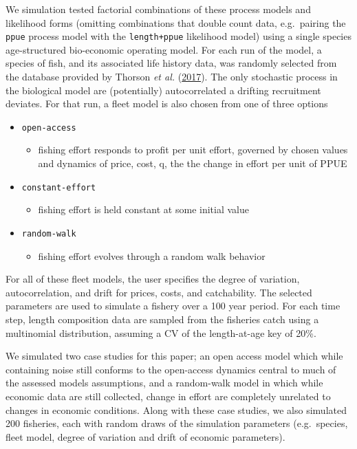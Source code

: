 \documentclass[twoside,12pt,final]{ucthesis-CA2012}
\providecommand{\tightlist}{%
  \setlength{\itemsep}{0pt}\setlength{\parskip}{0pt}}
\begin{document}
\begin{ucmainmatter}
We simulation tested factorial combinations of these process models and
likelihood forms (omitting combinations that double count data,
e.g.~pairing the \texttt{ppue} process model with the
\texttt{length+ppue} likelihood model) using a single species
age-structured bio-economic operating model. For each run of the model,
a species of fish, and its associated life history data, was randomly
selected from the database provided by Thorson \emph{et al.}
(\protect\hyperlink{ref-Thorson2017d}{2017}). The only stochastic
process in the biological model are (potentially) autocorrelated a
drifting recruitment deviates. For that run, a fleet model is also
chosen from one of three options
\begin{itemize}
\tightlist
\item
  \texttt{open-access}
  \begin{itemize}
  \tightlist
  \item
    fishing effort responds to profit per unit effort, governed by
    chosen values and dynamics of price, cost, q, the the change in
    effort per unit of PPUE
  \end{itemize}
\item
  \texttt{constant-effort}
  \begin{itemize}
  \tightlist
  \item
    fishing effort is held constant at some initial value
  \end{itemize}
\item
  \texttt{random-walk}
  \begin{itemize}
  \tightlist
  \item
    fishing effort evolves through a random walk behavior
  \end{itemize}
\end{itemize}
For all of these fleet models, the user specifies the degree of
variation, autocorrelation, and drift for prices, costs, and
catchability. The selected parameters are used to simulate a fishery
over a 100 year period. For each time step, length composition data are
sampled from the fisheries catch using a multinomial distribution,
assuming a CV of the length-at-age key of 20\%.

We simulated two case studies for this paper; an open access model which
while containing noise still conforms to the open-access dynamics
central to much of the assessed models assumptions, and a random-walk
model in which while economic data are still collected, change in effort
are completely unrelated to changes in economic conditions. Along with
these case studies, we also simulated 200 fisheries, each with random
draws of the simulation parameters (e.g.~species, fleet model, degree of
variation and drift of economic parameters).


\end{ucmainmatter}
\end{document}
